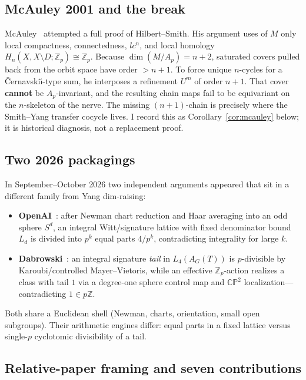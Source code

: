 \documentclass[11pt]{article}
\theoremstyle{definition}
\begin{document}
\subsection{McAuley 2001 and the break}
McAuley~\cite{mcauley2001} attempted a full proof of Hilbert--Smith.
His argument uses of $M$ only local compactness, connectedness, $lc^n$, and
local homology $H_n(X,X\setminus D;\mathbb{Z}_p)\cong\mathbb{Z}_p$.
Because $\dim(M/A_p)=n+2$, saturated covers pulled back from the orbit space
have order $>n+1$.  To force unique $n$-cycles for a \v{C}ernavski\u{\i}-type
sum, he interposes a refinement $U^m$ of order $n+1$.  That cover
\textbf{cannot} be $A_p$-invariant, and the resulting chain maps fail to be
equivariant on the $n$-skeleton of the nerve.  The missing $(n+1)$-chain is
precisely where the Smith--Yang transfer cocycle lives.  I record this as
Corollary~\ref{cor:mcauley} below; it is historical diagnosis, not a
replacement proof.

\subsection{Two 2026 packagings}
In September--October 2026 two independent arguments appeared that sit in a
different family from Yang dim-raising:
\begin{itemize}
\item \textbf{OpenAI}~\cite{openai2026}: after Newman chart reduction and Haar
averaging into an odd sphere $S^d$, an integral Witt/signature lattice with
fixed denominator bound $L_d$ is divided into $p^k$ equal parts
$4/p^k$, contradicting integrality for large $k$.
\item \textbf{Dabrowski}~\cite{dabrowski2026}: an integral signature
\emph{tail} in $L_4(A_G(T))$ is $p$-divisible by Karoubi/controlled
Mayer--Vietoris, while an effective $\mathbb{Z}_p$-action realizes a class
with tail $1$ via a degree-one sphere control map and $\mathbb{CP}^2$
localization---contradicting $1\in p\mathbb{Z}$.
\end{itemize}
Both share a Euclidean shell (Newman, charts, orientation, small open
subgroups).  Their arithmetic engines differ: equal parts in a fixed lattice
versus single-$p$ cyclotomic divisibility of a tail.

\subsection{Relative-paper framing and seven contributions}
\label{sec:contributions}
\end{document}
